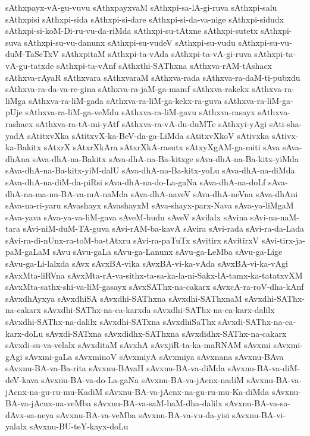 {sAthxpayx-vA-gu-vuvu
sAthxpayxvaM
sAthxpi-sa-lA-gi-ruva
sAthxpi-salu
sAthxpisi
sAthxpi-sida
sAthxpi-si-dare
sAthxpi-si-da-va-nige
sAthxpi-sidudx
sAthxpi-si-koM-Di-ru-vu-da-riMda
sAthxpi-su-tAtxne
sAthxpi-sutetx
sAthxpi-suva
sAthxpi-su-vu-danunx
sAthxpi-su-vudeV
sAthxpi-su-vudu
sAthxpi-su-vu-duM-TaSeTxV
sAthxpitaM
sAthxpi-ta-vAda
sAthxpi-ta-vA-gi-ruva
sAthxpi-ta-vA-gu-tatxde
sAthxpi-ta-vAnf
sAthxthi-SAThxna
sAthxva-rAM-tAshacx
sAthxva-rAyaR
sAthxvara
sAthxvaraM
sAthxva-rada
sAthxva-ra-daM-ti-pubxdu
sAthxva-ra-da-va-re-gina
sAthxva-ra-jaM-ga-mamf
sAthxva-rakekx
sAthxva-ra-liMga
sAthxva-ra-liM-gada
sAthxva-ra-liM-ga-kekx-ra-guva
sAthxva-ra-liM-ga-pUje
sAthxva-ra-liM-ga-veMdu
sAthxva-ra-liM-gavu
sAthxva-rasayx
sAthxva-rashacx
sAthxva-ra-tA-mi-yAtf
sAthxva-ra-vA-du-duMTe
sAthxyi-yAgi
sAti-sha-yadA
sAtitxvXka
sAtitxvX-ka-BeV-da-ga-LiMda
sAtitxvXkoV
sAtivxka
sAtivx-ka-Bakitx
sAtxrX
sAtxrXkAra
sAtxrXkA-rasutx
sAtxyXgAM-ga-miti
sAva
sAva-dhAna
sAva-dhA-na-Bakitx
sAva-dhA-na-Ba-kitxge
sAva-dhA-na-Ba-kitx-yiMda
sAva-dhA-na-Ba-kitx-yiM-dalU
sAva-dhA-na-Ba-kitx-yoLu
sAva-dhA-na-diMda
sAva-dhA-na-diM-da-piRsi
sAva-dhA-na-do-La-gaNa
sAva-dhA-na-doLf
sAva-dhA-na-ma-nu-BA-va-mA-naMda
sAva-dhA-naveV
sAva-dhA-neVna
sAva-dhAni
sAva-na-ri-yaru
sAvashayx
sAvashayxM
sAva-shayx-parx-Nava
sAva-ya-liMgaM
sAva-yava
sAva-ya-va-liM-gava
sAveM-budu
sAveV
sAvilalx
sAvina
sAvi-na-naM-tara
sAvi-niM-duM-TA-guva
sAvi-rAM-ba-kavA
sAvira
sAvi-rada
sAvi-ra-da-Lada
sAvi-ra-di-nUnx-ra-toM-ba-tAtxru
sAvi-ra-paTuTx
sAvitirx
sAvitirxV
sAvi-tirx-ja-paM-gaLaM
sAvu
sAvu-gaLa
sAvu-ga-Lanunx
sAvu-ga-LeMba
sAvu-ga-Lige
sAvu-ga-Li-lalxda
sAvx
sAvxBA-vika
sAvxBA-vi-ka-vAda
sAvxBA-vi-ka-vAgi
sAvxMta-liRVna
sAvxMta-rA-va-sithx-ta-sa-ka-la-ni-Sakx-lA-tamx-ka-tatatxvXM
sAvxMta-sathx-shi-va-liM-gasayx
sAvxSAThx-na-cakarx
sAvxcA-ra-roV-dha-kAnf
sAvxdhAyxya
sAvxdhiSA
sAvxdhi-SAThxna
sAvxdhi-SAThxnaM
sAvxdhi-SAThx-na-cakarx
sAvxdhi-SAThx-na-ca-karxda
sAvxdhi-SAThx-na-ca-karx-dalilx
sAvxdhi-SAThx-na-dalilx
sAvxdhi-SATxna
sAvxdhiSaThx
sAvxdi-SAThx-na-ca-karx-doLu
sAvxdi-SATxna
sAvxdidhx-SAThxna
sAvxdidhx-SAThx-na-cakarx
sAvxdi-su-va-velalx
sAvxditaM
sAvxhA
sAvxjiR-ta-ka-maRNAM
sAvxmi
sAvxmi-gAgi
sAvxmi-gaLa
sAvxminoV
sAvxmiyA
sAvxmiya
sAvxnana
sAvxnu-BAva
sAvxnu-BA-va-Ba-rita
sAvxnu-BAvaH
sAvxnu-BA-va-diMda
sAvxnu-BA-va-diM-deV-kava
sAvxnu-BA-va-do-La-gaNa
sAvxnu-BA-va-jAcnx-nadiM
sAvxnu-BA-va-jAcnx-na-gu-ru-mu-KadiM
sAvxnu-BA-va-jAcnx-na-gu-ru-mu-Ka-diMda
sAvxnu-BA-va-jAcnx-na-veMba
sAvxnu-BA-va-saM-baM-dha-dalilx
sAvxnu-BA-va-sa-dAvx-sa-neya
sAvxnu-BA-va-veMba
sAvxnu-BA-va-vu-da-yisi
sAvxnu-BA-vi-yalalx
sAvxnu-BU-teY-kayx-doLu
}
